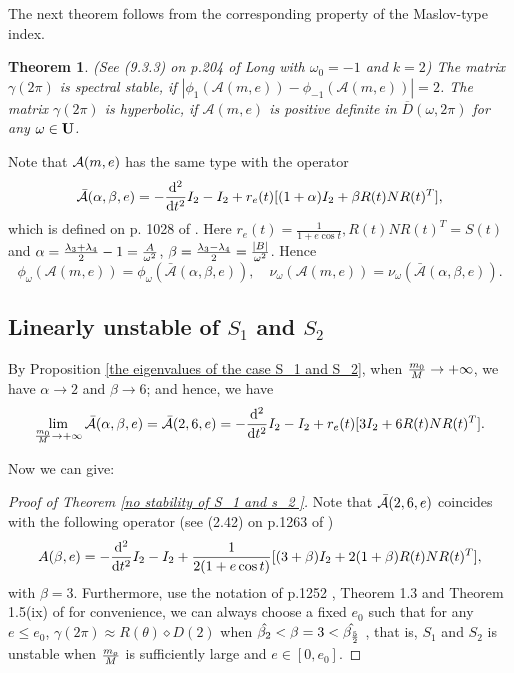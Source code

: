 \documentclass[11pt]{article}
\newtheorem{theorem}[lemma]{Theorem}
\def\d{{\mathrm{d}}}
\def\U{{\bf U}}
\def\om{{\omega}}
\def\cA{{\cal A}}
\begin{document}
The next theorem follows from the corresponding property
of the Maslov-type index.

\begin{theorem} \label{criteria of spectral stability}
(See (9.3.3) on p.204 of Long \cite{Lon4} with $\omega_0=-1$  and $k=2$)
The matrix $\gamma(2\pi)$ is spectral stable,
if $|\phi_{1}(\mathcal{A}(m,e))-\phi_{-1}(\mathcal{A}(m,e))|=2$.
The matrix $\gamma(2\pi)$ is hyperbolic,
if $\mathcal{A}(m,e)$ is positive definite
in $\overline{D}(\omega,2\pi)$ for any $\omega\in\U$.

    
\end{theorem}

Note that $\cA(m,e)$ has the same type with
the operator
\begin{equation}\label{bar.A}
    \bar\cA(\alpha,\beta,e)= -\frac{\d^2}{\d t^2}I_2  -I_2 +
    r_e(t)[(1+\alpha)I_2+\beta R(t)NR(t)^T],
\end{equation}
which is defined on p. 1028
of \cite{Hu2020}.
Here $r_e(t)=\frac{1}{1+e\cos t},R(t)NR(t)^T=S(t)$ and 
$\alpha=\frac{\lambda_3+\lambda_4}{2}-1={A\over\om^2}$,
$\beta=\frac{\lambda_3-\lambda_4}{2}={|B|\over\om^2}$. 
Hence
$$
\phi_{\omega}(\mathcal{A}(m,e))
=\phi_{\omega}(\bar{\mathcal{A}}(\alpha,\beta,e)),\quad
\nu_{\omega}(\mathcal{A}(m,e))
=\nu_{\omega}(\bar{\mathcal{A}}(\alpha,\beta,e)).
$$

\subsection{Linearly unstable of \texorpdfstring{$S_1$}{S\_1} and \texorpdfstring{$S_2$}{S\_2}}
By Proposition \ref{the eigenvalues of the case S_1 and S_2},
when ${m_0\over M}\to+\infty$,
we have $\alpha\to2$ and $\beta\to6$;
and hence, we have
\begin{eqnarray}
    \lim_{{m_0\over M}\to+\infty}\bar\cA(\alpha,\beta,e)=\bar\cA(2,6,e)= -\frac{\d^2}{\d t^2}I_2  -I_2 +
    r_e(t)[3I_2+6 R(t)NR(t)^T].
\end{eqnarray}

Now we can give:

\begin{proof}[Proof of Theorem \ref{no stability of S_1 and s_2 }]
Note that $\bar\cA(2,6,e)$
coincides with the following operator (see (2.42) on p.1263 of \cite{Zhou2017})
\begin{equation}
    A(\beta,e) = -\frac{\d^2}{\d t^2}I_2  -I_2 +
   {1\over2(1+e\cos{t})}[(3+\beta)I_2+2(1+\beta)R(t)NR(t)^T],
\end{equation}
with $\beta=3$. Furthermore, use the notation of p.1252 , Theorem 1.3 and Theorem 1.5(ix) of \cite{Zhou2017} for convenience, we can always choose a fixed $e_0$ such that for any $e\leq e_0$, $\gamma(2\pi)\approx R(\theta)\diamond D(2)$ when $\hat{\beta_2}<\beta=3<\hat{\beta_{5\over 2}}$ , that is, $S_1$ and $S_2$ is unstable when ${m_o\over M}$ is sufficiently large and $e\in [0,e_0]$. 
\end{proof}
\end{document}
